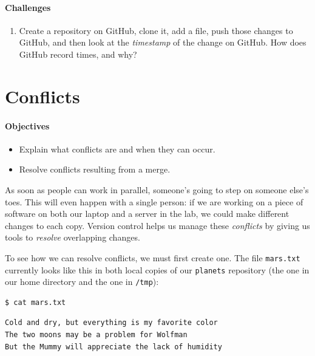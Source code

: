 \documentclass[]{book}
\newcommand{\gdef}[2]{\emph{#2}}
\begin{document}
\mbox{}\paragraph{Challenges}

\begin{enumerate}
\item
  Create a repository on GitHub, clone it, add a file, push those
  changes to GitHub, and then look at the
  \gdef{g:timestamp}{timestamp} of the change on GitHub. How does
  GitHub record times, and why?
\end{enumerate}

\section{Conflicts}

\mbox{}\paragraph{Objectives}

\begin{itemize}
\item
  Explain what conflicts are and when they can occur.
\item
  Resolve conflicts resulting from a merge.
\end{itemize}

As soon as people can work in parallel, someone's going to step on
someone else's toes. This will even happen with a single person: if we
are working on a piece of software on both our laptop and a server in
the lab, we could make different changes to each copy. Version control
helps us manage these \gdef{g:conflict}{conflicts} by giving us
tools to \gdef{g:resolve}{resolve} overlapping changes.

To see how we can resolve conflicts, we must first create one. The file
\texttt{mars.txt} currently looks like this in both local copies of our
\texttt{planets} repository (the one in our home directory and the one
in \texttt{/tmp}):

\begin{verbatim}
$ cat mars.txt
\end{verbatim}

\begin{verbatim}
Cold and dry, but everything is my favorite color
The two moons may be a problem for Wolfman
But the Mummy will appreciate the lack of humidity
\end{verbatim}
\end{document}
